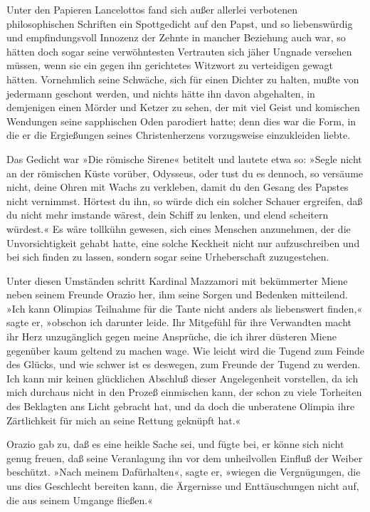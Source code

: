 Unter den Papieren Lancelottos fand sich außer allerlei verbotenen
philosophischen Schriften ein Spottgedicht auf den Papst, und so
liebenswürdig und empfindungsvoll Innozenz der Zehnte in mancher
Beziehung auch war, so hätten doch sogar seine verwöhntesten
Vertrauten sich jäher Ungnade versehen müssen, wenn sie ein gegen
ihn gerichtetes Witzwort zu verteidigen gewagt hätten. Vornehmlich
seine Schwäche, sich für einen Dichter zu halten, mußte von
jedermann geschont werden, und nichts hätte ihn davon abgehalten,
in demjenigen einen Mörder und Ketzer zu sehen, der mit viel Geist
\pagenum{[57]} und komischen Wendungen seine sapphischen Oden
parodiert hatte; denn dies war die Form, in die er die Ergießungen
seines Christenherzens vorzugsweise einzukleiden liebte.

Das Gedicht war »Die römische Sirene« betitelt und lautete etwa so:
»Segle nicht an der römischen Küste vorüber, Odysseus, oder tust du
es dennoch, so versäume nicht, deine Ohren mit Wachs zu verkleben,
damit du den Gesang des Papstes nicht vernimmst. Hörtest du ihn, so
würde dich ein solcher Schauer ergreifen, daß du nicht mehr
imstande wärest, dein Schiff zu lenken, und elend scheitern
würdest.« Es wäre tollkühn gewesen, sich eines Menschen anzunehmen,
der die Unvorsichtigkeit gehabt hatte, eine solche Keckheit nicht
nur aufzuschreiben und bei sich finden zu lassen, sondern sogar
seine Urheberschaft zuzugestehen.

Unter diesen Umständen schritt Kardinal Mazzamori mit bekümmerter
Miene neben seinem Freunde Orazio her, ihm seine Sorgen und
Bedenken mitteilend. »Ich kann Olimpias Teilnahme für die Tante
nicht anders als liebenswert finden,« sagte er, »obschon ich
darunter leide. Ihr Mitgefühl für ihre Verwandten macht ihr Herz
unzugänglich gegen meine Ansprüche, die ich ihrer düsteren Miene
gegenüber kaum geltend zu machen wage. Wie leicht wird die Tugend
zum Feinde des Glücks, und wie schwer ist es deswegen, zum Freunde
der Tugend zu werden. Ich kann mir keinen glücklichen Abschluß
dieser Angelegenheit vorstellen, da ich mich durchaus nicht in den
Prozeß einmischen kann, der schon zu viele Torheiten des Beklagten
ans Licht gebracht hat, und da doch die unberatene Olimpia ihre
Zärtlichkeit für mich an seine Rettung geknüpft hat.«

Orazio gab zu, daß es eine heikle Sache sei, und fügte bei, er
könne sich nicht genug freuen, daß seine Veranlagung ihn
\pagenum{[58]} vor dem unheilvollen Einfluß der Weiber beschützt.
»Nach meinem Dafürhalten«, sagte er, »wiegen die Vergnügungen, die
uns dies Geschlecht bereiten kann, die Ärgernisse und
Enttäuschungen nicht auf, die aus seinem Umgange fließen.«

